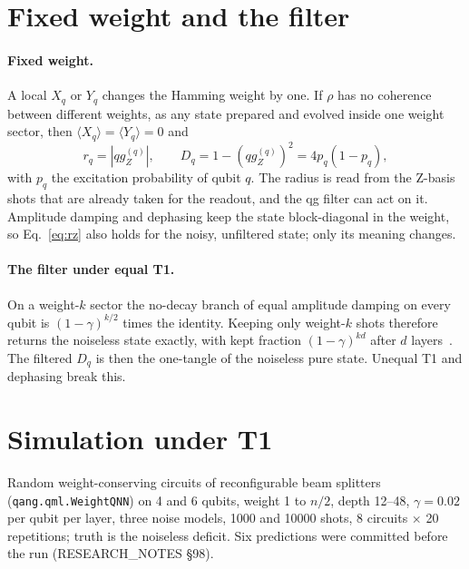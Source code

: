 \documentclass[11pt]{article}
\newcommand{\qZ}{qg_Z}
\begin{document}
\section{Fixed weight and the filter}

\paragraph{Fixed weight.} A local $X_q$ or $Y_q$ changes the Hamming weight by one. If $\rho$ has no coherence between
different weights, as any state prepared and evolved inside one weight sector, then $\langle X_q\rangle=\langle
Y_q\rangle=0$ and
\begin{equation}\label{eq:rz}
r_q=|\qZ^{(q)}|,\qquad D_q=1-(\qZ^{(q)})^2=4p_q(1-p_q),
\end{equation}
with $p_q$ the excitation probability of qubit $q$. The radius is read from the Z-basis shots that are already taken
for the readout, and the qg filter can act on it. Amplitude damping and dephasing keep the state block-diagonal in the
weight, so Eq.~\eqref{eq:rz} also holds for the noisy, unfiltered state; only its meaning changes.

\paragraph{The filter under equal T1.} On a weight-$k$ sector the no-decay branch of equal amplitude damping on every
qubit is $(1-\gamma)^{k/2}$ times the identity. Keeping only weight-$k$ shots therefore returns the noiseless state
exactly, with kept fraction $(1-\gamma)^{kd}$ after $d$ layers~\cite{monteverde2026qml}. The filtered $D_q$ is then the
one-tangle of the noiseless pure state. Unequal T1 and dephasing break this.

\section{Simulation under T1}

Random weight-conserving circuits of reconfigurable beam splitters (\texttt{qang.qml.WeightQNN}) on 4 and 6 qubits,
weight 1 to $n/2$, depth 12--48, $\gamma=0.02$ per qubit per layer, three noise models, 1000 and 10000 shots, 8
circuits $\times$ 20 repetitions; truth is the noiseless deficit. Six predictions were committed before the run
(RESEARCH\_NOTES \S98).
\end{document}
